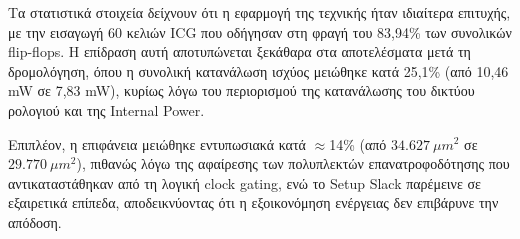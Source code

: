 \begin{table}[H]
    \centering
    \caption{Power Consumption per Category post Routing}
\end{table}

Τα στατιστικά στοιχεία δείχνουν ότι η εφαρμογή της τεχνικής ήταν ιδιαίτερα επιτυχής, με την εισαγωγή 60 κελιών ICG που οδήγησαν στη φραγή του 83,94\% των συνολικών flip-flops. Η επίδραση αυτή αποτυπώνεται ξεκάθαρα στα αποτελέσματα μετά τη δρομολόγηση, όπου η συνολική κατανάλωση ισχύος μειώθηκε κατά 25,1\% (από 10,46 mW σε 7,83 mW), κυρίως λόγω του περιορισμού της κατανάλωσης του δικτύου ρολογιού και της Internal Power. 

Επιπλέον, η επιφάνεια μειώθηκε εντυπωσιακά κατά $\approx$14\% (από $34.627~\mu m^2$ σε $29.770~\mu m^2$), πιθανώς λόγω της αφαίρεσης των πολυπλεκτών επανατροφοδότησης που αντικαταστάθηκαν από τη λογική clock gating, ενώ το Setup Slack παρέμεινε σε εξαιρετικά επίπεδα, αποδεικνύοντας ότι η εξοικονόμηση ενέργειας δεν επιβάρυνε την απόδοση.